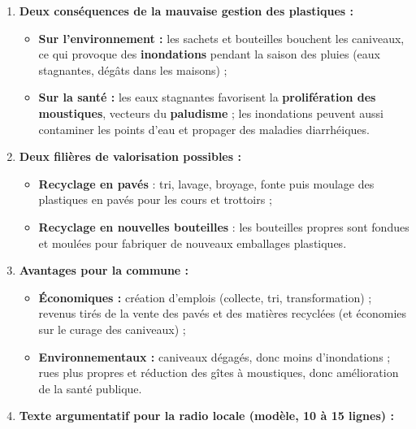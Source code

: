 \documentclass[11pt]{article}
\begin{document}
\begin{corrige}
\begin{enumerate}
\item \textbf{Deux conséquences de la mauvaise gestion des plastiques :}
\begin{itemize}
\item \textbf{Sur l'environnement :} les sachets et bouteilles bouchent les caniveaux, ce qui provoque des \textbf{inondations} pendant la saison des pluies (eaux stagnantes, dégâts dans les maisons) ;
\item \textbf{Sur la santé :} les eaux stagnantes favorisent la \textbf{prolifération des moustiques}, vecteurs du \textbf{paludisme} ; les inondations peuvent aussi contaminer les points d'eau et propager des maladies diarrhéiques.
\end{itemize}
\item \textbf{Deux filières de valorisation possibles :}
\begin{itemize}
\item \textbf{Recyclage en pavés} : tri, lavage, broyage, fonte puis moulage des plastiques en pavés pour les cours et trottoirs ;
\item \textbf{Recyclage en nouvelles bouteilles} : les bouteilles propres sont fondues et moulées pour fabriquer de nouveaux emballages plastiques.
\end{itemize}
\item \textbf{Avantages pour la commune :}
\begin{itemize}
\item \textbf{Économiques :} création d'emplois (collecte, tri, transformation) ; revenus tirés de la vente des pavés et des matières recyclées (et économies sur le curage des caniveaux) ;
\item \textbf{Environnementaux :} caniveaux dégagés, donc moins d'inondations ; rues plus propres et réduction des gîtes à moustiques, donc amélioration de la santé publique.
\end{itemize}
\item \textbf{Texte argumentatif pour la radio locale (modèle, 10 à 15 lignes) :}


\end{enumerate}
\end{corrige}
\end{document}
